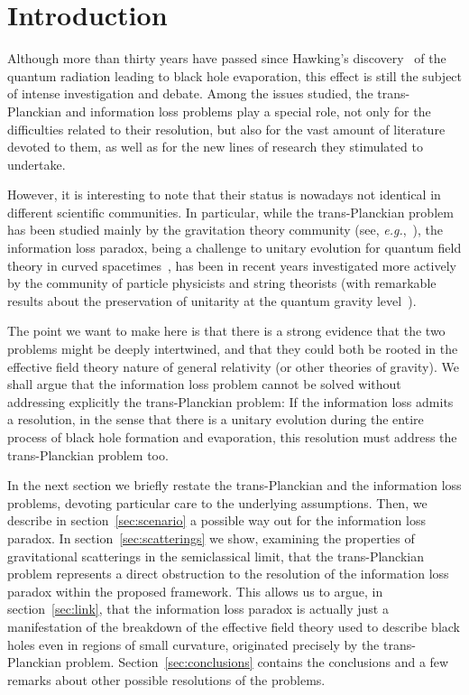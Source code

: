 \documentclass[prd,groupedaddress, showpacs, showkeys, onecolumn, nofootinbib, 12pt]{revtex4-2}
\def\eg{{\em e.g.\/}}%
\begin{document}
\newpage

\section{Introduction}
\label{sec:intro}

Although more than thirty years have passed since Hawking's discovery~\cite{Hawking:1974rv, Hawking:1974sw} of the quantum radiation leading to black hole evaporation, this effect is still the subject of intense investigation and debate. Among the issues studied, the trans-Planckian and information loss problems play a special role, not only for the difficulties related to their resolution, but also for the vast amount of literature devoted to them, as well as for the new lines of research they stimulated to undertake.

However, it is interesting to note that their status is nowadays not identical in different scientific communities.  In particular, while the trans-Planckian problem has been studied mainly by the gravitation theory community (see, \eg,~\cite{Unruh:1980cg,Unruh:1994je,Brout:1995wp,Corley:1996ar,Barrabes:1998iw,Parentani:1999qv,Barrabes:2000fr,Parentani:2000ts,Parentani:2007mb,Unruh:2004zk}), the information loss paradox, being a challenge to unitary evolution for quantum field theory in curved spacetimes~\cite{Hawking:1976ra, Hawking:1982dj}, has been in recent years investigated more actively by the community of particle physicists and string theorists (with remarkable results about the preservation of unitarity at the quantum gravity level~\cite{Stephens:1993an, 'tHooft:1996tq, Maldacena:2001kr}).

The point we want to make here is that there is a strong evidence that the two problems might be deeply intertwined, and that they could both be rooted in the effective field theory nature of general relativity (or other theories of gravity).  We shall argue that the information loss problem cannot be solved without addressing explicitly the trans-Planckian problem:  If the information loss admits a resolution, in the sense that there is a unitary evolution during the entire process of black hole formation and evaporation, this resolution must address the trans-Planckian problem too.

In the next section we briefly restate the trans-Planckian and the information loss problems, devoting particular care to the underlying assumptions.  Then, we describe in section~\ref{sec:scenario} a possible way out for the information loss paradox.  In section~\ref{sec:scatterings} we show, examining the properties of gravitational scatterings in the semiclassical limit, that the trans-Planckian problem represents a direct obstruction to the resolution of the information loss paradox within the proposed framework.  This allows us to argue, in section~\ref{sec:link}, that the information loss paradox is actually just a manifestation of the breakdown of the effective field theory used to describe black holes even in regions of small curvature, originated precisely by the trans-Planckian problem.  Section~\ref{sec:conclusions} contains the conclusions and a few remarks about other possible resolutions of the problems.
\end{document}
